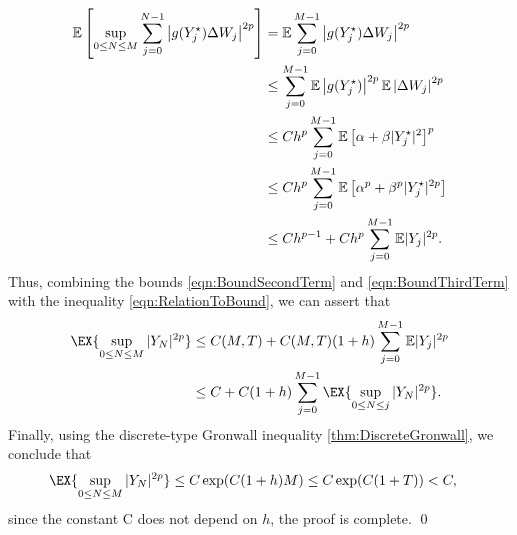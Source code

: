 \documentclass[3p]{elsarticle}
\theoremstyle{definition}
\theoremstyle{plain}%
\theoremstyle{remark}
\newcommand{\m}[1]{\mathbb{E}#1}
\begin{document}
\begin{pf}
\begin{align}
	\m\left[
		\sup_{0\leq N \leq M}
			\sum_{j=0}^{N-1}
			\left|
				g(Y_j^{\star})\Delta W_j
			\right|^{2p}	
		\right]
		&=
			\m
				\sum_{j=0}^{M-1}
					\left|
						g(Y_j^{\star})\Delta W_j
					\right|^{2p}
			\notag\\
		&\leq	
			\sum_{j=0}^{M-1}
				\m
					\left|
						g(Y_j^{\star})
					\right|^{2p}
				\m
					\left|
						\Delta W_j
					\right|^{2p}
			\notag \\
		&\leq
			C h^p
			\sum_{j=0}^{M-1}
			\m
				\left[
					\alpha +\beta|Y^{\star}_j|^2
				\right]^p
			\notag\\
		&\leq
			Ch^p
			\sum_{j=0}^{M-1}
			\m
				\left[
					\alpha ^p +\beta^p |Y^{\star}_j|^{2p}
				\right]
			\notag\\
		&\leq
		Ch^{p-1}
		+
		Ch^p \sum_{j=0}^{M-1}
			\m|Y_j|^{2p} \label{eqn:BoundThirdTerm}.
	\end{align}
	Thus, combining the bounds \eqref{eqn:BoundSecondTerm} and \eqref{eqn:BoundThirdTerm} with the inequality 
	\eqref{eqn:RelationToBound}, we can assert that
	\begin{align}
		\EX{
			\sup_{0\leq N \leq M}
					|Y_N|^{2p} 
		}
		&\leq
			C(M,T) + C(M,T)(1+h)
			\sum_{j=0}^{M-1}
				\m|Y_j|^{2p}  
			\notag \\
		&\leq	
			C +C(1+h) 
			\sum_{j=0}^{M-1}
				\EX{
					\sup_{0\leq N \leq j}
					|Y_N|^{2p}
				}	
		.
	\end{align}
	Finally, using the discrete-type Gronwall inequality \eqref{thm:DiscreteGronwall}, we conclude that
	\begin{align*}
		\EX{
			\sup_{0\leq N \leq M}
			|Y_N|^{2p} 
		}	
		&\leq
			C\exp(C(1+h)M) 
		\leq 
		C \exp(C(1+T))<C,
	\end{align*}
	since the constant C does not depend on $h$, the proof is complete. \qed
\end{pf}
	
\end{document}
